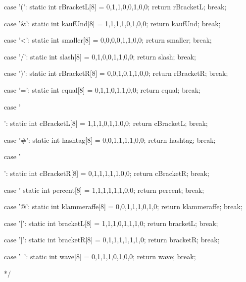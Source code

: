 {{    case '(':
    static int rBracketL[8] = {0,1,1,0,0,1,0,0};
    return rBracketL;
    break;

    case '&':
    static int kaufUnd[8] = {1,1,1,1,0,1,0,0};
    return kaufUnd;
    break;

    case '<':
    static int smaller[8] = {0,0,0,0,1,1,0,0};
    return smaller;
    break;

    case '/':
    static int slash[8] = {0,1,0,0,1,1,0,0};
    return slash;
    break;

    case ')':
    static int rBracketR[8] = {0,0,1,0,1,1,0,0};
    return rBracketR;
    break;

    case '=':
    static int equal[8] = {0,1,1,0,1,1,0,0};
    return equal;
    break;

    case '{':
    static int cBracketL[8] = {1,1,1,0,1,1,0,0};
    return cBracketL;
    break;

    case '#':
    static int hashtag[8] = {0,0,1,1,1,1,0,0};
    return hashtag;
    break;

    case '}':
    static int cBracketR[8] = {0,1,1,1,1,1,0,0};
    return cBracketR;
    break;

    case '%
    static int percent[8] = {1,1,1,1,1,1,0,0};
    return percent;
    break;

    case '@':
    static int klammeraffe[8] = {0,0,1,1,1,0,1,0};
    return klammeraffe;
    break;

    case '[':
    static int bracketL[8] = {1,1,1,0,1,1,1,0};
    return bracketL;
    break;

    case ']':
    static int bracketR[8] = {0,1,1,1,1,1,1,0};
    return bracketR;
    break;

    case '~':
    static int wave[8] = {0,1,1,1,0,1,0,0};
    return wave;
    break;
    
*/    
   }
}
